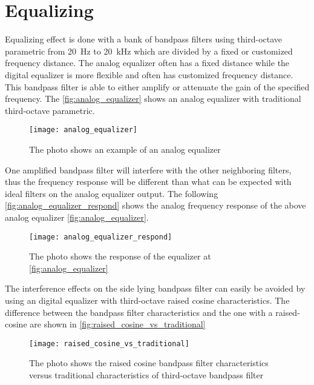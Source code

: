 \section{Equalizing}
Equalizing effect is done with a bank of bandpass filters using third-octave parametric from \SI{20}{\hertz} to \SI{20}{\kilo\hertz} which are divided by a fixed or customized frequency distance. The analog equalizer often has a fixed distance while the digital equalizer is more flexible and often has customized frequency distance. This bandpass filter is able to either amplify or attenuate the gain of the specified frequency. The \autoref{fig:analog_equalizer} shows an analog equalizer with traditional third-octave parametric. %

\begin{figure} [htbp]
 \centering
  \texttt{[image: analog\_equalizer]}
  \caption{The photo shows an example of an analog equalizer}
  \label{fig:analog_equalizer}
\end{figure}

One amplified bandpass filter will interfere with the other neighboring filters, thus the frequency response will be different than what can be expected with ideal filters on the analog equalizer output. The following \autoref{fig:analog_equalizer_respond} shows the analog frequency response of the above analog equalizer \autoref{fig:analog_equalizer}.

\begin{figure} [htbp]
 \centering
  \texttt{[image: analog\_equalizer\_respond]}
  \caption{The photo shows the response of the equalizer at \autoref{fig:analog_equalizer} }
  \label{fig:analog_equalizer_respond}
\end{figure}

The interference effects on the side lying bandpass filter can easily be avoided by using an digital equalizer with third-octave raised cosine characteristics. The difference between the  bandpass filter characteristics and the one with a raised-cosine are shown in \autoref{fig:raised_cosine_vs_traditional}

\begin{figure} [htbp]
 \centering
  \texttt{[image: raised\_cosine\_vs\_traditional]}
  \caption{The photo shows the raised cosine bandpass filter characteristics versus traditional characteristics of third-octave bandpass filter %
  }
  \label{fig:raised_cosine_vs_traditional}
\end{figure}



